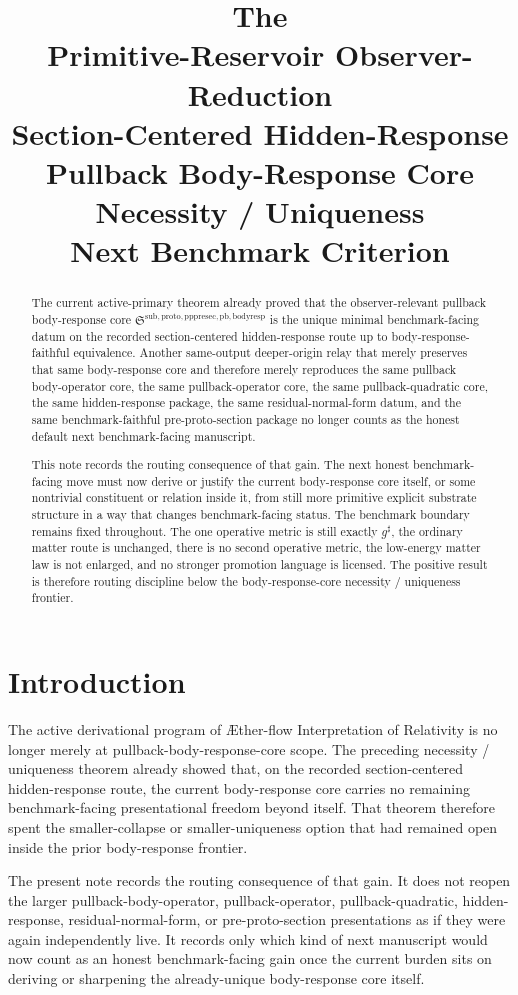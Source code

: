 \documentclass[11pt]{article}
\title{\textbf{The \TheoryName{}}\\[0.4em]
\large Primitive-Reservoir Observer-Reduction\\
\large Section-Centered Hidden-Response\\
\large Pullback Body-Response Core Necessity / Uniqueness\\
\large Next Benchmark Criterion}
\author{}
\date{}
\newcommand{\Aflow}{\AE{}ther-flow}
\newcommand{\TheoryName}{\Aflow{} Interpretation of Relativity}
\newcommand{\CompletedMetric}{g^{\sharp}}
\newcommand{\PullbackBodyResponseCore}{\mathfrak S^{\mathrm{sub,proto,pppresec,pb,bodyresp}}}
\begin{document}
\maketitle

\begin{abstract}
The current active-primary theorem already proved that the observer-relevant pullback body-response core \(\PullbackBodyResponseCore\) is the unique minimal benchmark-facing datum on the recorded section-centered hidden-response route up to body-response-faithful equivalence. Another same-output deeper-origin relay that merely preserves that same body-response core and therefore merely reproduces the same pullback body-operator core, the same pullback-operator core, the same pullback-quadratic core, the same hidden-response package, the same residual-normal-form datum, and the same benchmark-faithful pre-proto-section package no longer counts as the honest default next benchmark-facing manuscript.

This note records the routing consequence of that gain. The next honest benchmark-facing move must now derive or justify the current body-response core itself, or some nontrivial constituent or relation inside it, from still more primitive explicit substrate structure in a way that changes benchmark-facing status. The benchmark boundary remains fixed throughout. The one operative metric is still exactly \(\CompletedMetric\), the ordinary matter route is unchanged, there is no second operative metric, the low-energy matter law is not enlarged, and no stronger promotion language is licensed. The positive result is therefore routing discipline below the body-response-core necessity / uniqueness frontier.
\end{abstract}

\section{Introduction}

The active derivational program of \TheoryName{} is no longer merely at pullback-body-response-core scope. The preceding necessity / uniqueness theorem already showed that, on the recorded section-centered hidden-response route, the current body-response core carries no remaining benchmark-facing presentational freedom beyond itself. That theorem therefore spent the smaller-collapse or smaller-uniqueness option that had remained open inside the prior body-response frontier.

The present note records the routing consequence of that gain. It does not reopen the larger pullback-body-operator, pullback-operator, pullback-quadratic, hidden-response, residual-normal-form, or pre-proto-section presentations as if they were again independently live. It records only which kind of next manuscript would now count as an honest benchmark-facing gain once the current burden sits on deriving or sharpening the already-unique body-response core itself.
\end{document}
